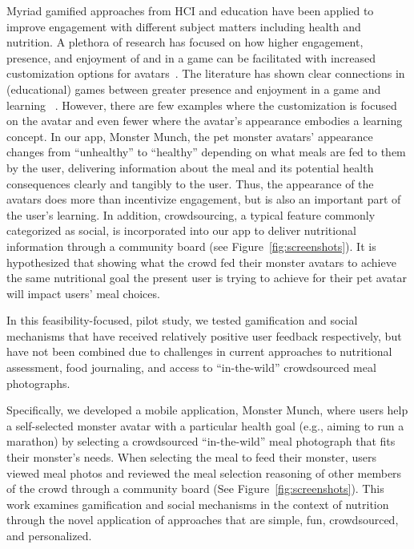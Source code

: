 Myriad gamified approaches from HCI and education have been applied to improve engagement with different subject matters including health and nutrition. A plethora of research has focused on how higher engagement, presence, and enjoyment of and in a game can be facilitated with increased customization options for avatars~\cite{ahn2017immersive,bailey2009avatar,birk2016fostering,li2013player,trepte2010avatar,turkay2014effects,turkay2015effects}. The literature has shown clear connections in (educational) games between greater presence and enjoyment in a game and learning ~\cite{de2019algebright,huizenga2009mobile,lin2017character,lin2019evaluating,ng2013examining,vogel2006computer}. However, there are few examples where the customization is focused on the avatar and even fewer where the avatar's appearance embodies a learning concept. 
In our app, Monster Munch, the pet monster avatars' appearance changes from ``unhealthy'' to ``healthy'' depending on what meals are fed to them by the user, delivering information about the meal and its potential health consequences clearly and tangibly to the user. Thus, the appearance of the avatars does more than incentivize engagement, but is also an important part of the user's learning. In addition, crowdsourcing, a typical feature commonly categorized as social, is incorporated into our app to deliver nutritional information through a community board (see Figure~\ref{fig:screenshots}). It is hypothesized that showing what the crowd fed their monster avatars to achieve the same nutritional goal the present user is trying to achieve for their pet avatar will impact users' meal choices.

In this feasibility-focused, pilot study, we tested gamification and social mechanisms that have received relatively positive user feedback respectively, but have not been combined due to challenges in current approaches to nutritional assessment, food journaling, and access to ``in-the-wild'' crowdsourced meal photographs.

Specifically, we developed a mobile application, Monster Munch, where users help a self-selected monster avatar with a particular health goal (e.g., aiming to run a marathon) by selecting a crowdsourced ``in-the-wild'' meal photograph that fits their monster's needs. When selecting the meal to feed their monster, users viewed meal photos and reviewed the meal selection reasoning of other members of the crowd through a community board (See Figure~\ref{fig:screenshots}). This work examines gamification and social mechanisms in the context of nutrition through the novel application of approaches that are simple, fun, crowdsourced, and personalized. 

